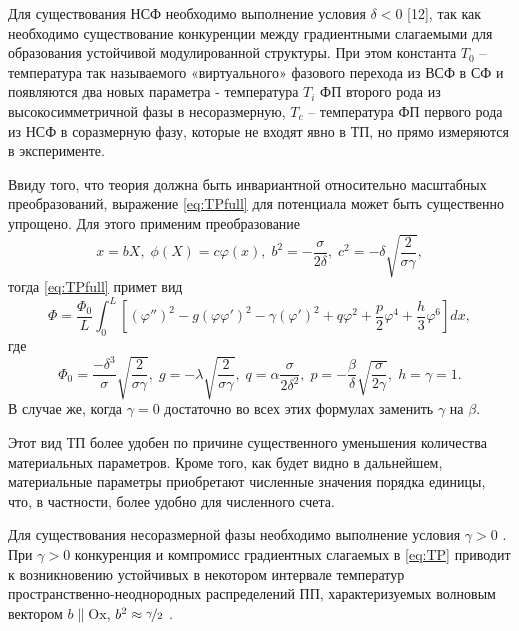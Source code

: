Для существования НСФ необходимо выполнение условия $\delta < 0$ \cite{Ishibashi1978}[12], так как необходимо существование конкуренции между градиентными слагаемыми для образования устойчивой модулированной структуры.
При этом константа $T_0$ -- температура так называемого «виртуального» фазового перехода из ВСФ в СФ и появляются два новых параметра - температура $T_i$ ФП второго рода из высокосимметричной фазы в несоразмерную, $T_c$ -- температура ФП первого рода из НСФ в соразмерную фазу, которые не входят явно в ТП, но прямо измеряются в эксперименте.

Ввиду того, что теория должна быть инвариантной относительно масштабных преобразований, выражение \eqref{eq:TPfull} для потенциала может быть существенно упрощено.
Для этого применим преобразование
\begin{equation}
x = bX, \; \phi(X) = c\varphi(x), \; b^2 = -\frac{\sigma}{2\delta}, \; c^2 = -\delta\sqrt{\frac{2}{\sigma\gamma}},
\label{eq:subst}
\end{equation}
тогда \eqref{eq:TPfull} примет вид
\begin{equation}
\Phi = \frac{\Phi_0}{L} \int_0^L \left[
            \left(\varphi''\right)^2 - g\left(\varphi\varphi'\right)^2 -
            \gamma\left(\varphi'\right)^2 +
            q\varphi^2 + \frac{p}{2}\varphi^4 + \frac{h}{3}\varphi^6
            \right] dx,
\label{eq:TP}
\end{equation}
где
\begin{equation}
\Phi_0 = \frac{-\delta^3}{\sigma}\sqrt{\frac{2}{\sigma\gamma}},\;
g = -\lambda\sqrt{\frac{2}{\sigma\gamma}},\;
q = \alpha\frac{\sigma}{2\delta^2},\;
p = -\frac{\beta}{\delta}\sqrt{\frac{\sigma}{2\gamma}},\;
h = \gamma = 1.
\label{eq:TPparts}
\end{equation}
В случае же, когда $\gamma=0$ достаточно во всех этих формулах заменить $\gamma$ на $\beta$.

Этот вид ТП более удобен по причине существенного уменьшения количества материальных параметров.
Кроме того, как будет видно в дальнейшем, материальные параметры приобретают численные значения порядка единицы, что, в частности, более удобно для численного счета.

Для существования несоразмерной фазы необходимо выполнение условия $\gamma>0$ \cite{Ishibashi1978}.
При $\gamma>0$ конкуренция и компромисс градиентных слагаемых в \eqref{eq:TP} приводит к возникновению устойчивых в некотором интервале температур пространственно-неоднородных распределений ПП, характеризуемых волновым вектором $b \| \mathrm{Ox}$, $b^2 \approx \nicefrac{\gamma}{2}$ \cite{Ishibashi1978}.

